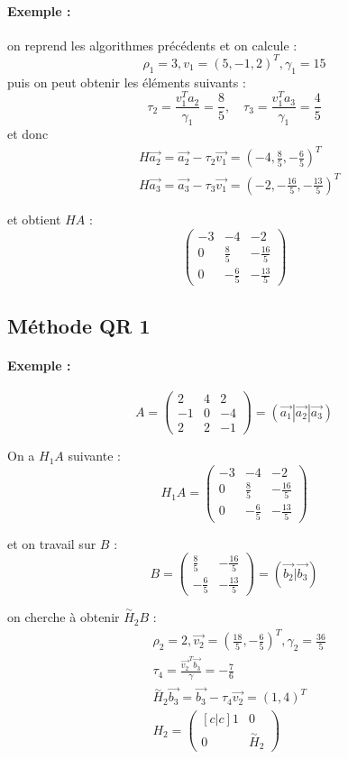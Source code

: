 \documentclass[a4paper,9pt]{extarticle}
\begin{document}
\begin{multicols*}{2}
\paragraph*{Exemple : } on reprend les algorithmes précédents et on calcule :
$$
\rho_1 = 3, v_1 = (5,-1,2)^T, \gamma_1 = 15
$$
puis on peut obtenir les éléments suivants :
$$
\tau_2 = \frac{v^T_1 a_2}{\gamma_1} = \frac{8}{5}, \quad 
\tau_3 = \frac{v^T_1 a_3}{\gamma_1} = \frac{4}{5}
$$
et donc
\begin{align*}
& H\vec{a_2} = \vec{a_2} - \tau_2\vec{v_1} = (-4,\frac{8}{5},-\frac{6}{5})^T \\
& H\vec{a_3} = \vec{a_3} - \tau_3\vec{v_1} = (-2,-\frac{16}{5},-\frac{13}{5})^T
\end{align*}

et obtient $HA$ :
$$
\begin{pmatrix}
-3 & -4 & -2 \\
0 & \frac{8}{5} & -\frac{16}{5} \\
0 & -\frac{6}{5} & -\frac{13}{5}
\end{pmatrix}
$$

\subsection{Méthode QR 1}
\paragraph*{Exemple : }
$$
A = \begin{pmatrix}
2 & 4 & 2 \\
-1 & 0 & -4 \\
2 & 2 & -1
\end{pmatrix} = (\vec{a_1}|\vec{a_2}|\vec{a_3})
$$

On a $H_1A$ suivante :
$$
H_1A = \begin{pmatrix}
-3 & -4 & -2 \\
0 & \frac{8}{5} & -\frac{16}{5} \\
0 & -\frac{6}{5} & -\frac{13}{5}
\end{pmatrix}
$$

et on travail sur $B$ :
$$
B = \begin{pmatrix}
\frac{8}{5} & -\frac{16}{5} \\
-\frac{6}{5} & -\frac{13}{5}
\end{pmatrix} = (\vec{b_2}|\vec{b_3})
$$

on cherche à obtenir $\overset{\sim}{H}_2B$ :
\begin{align*}
& \rho_2 = 2, \vec{v_2} = (\frac{18}{5},-\frac{6}{5})^T, \gamma_2=\frac{36}{5} \\
& \tau_4 = \frac{\vec{v_2}^T\vec{b_3}}{\gamma} = -\frac{7}{6}\\
& \overset{\sim}{H}_2\vec{b_3} = \vec{b_3} - \tau_4\vec{v_2} = (1,4)^T \\
& H_2 = 
\begin{pmatrix}[c|c]
1 & 0 \\ \hline
0 & \overset{\sim}{H}_2
\end{pmatrix}
\end{align*}


\end{multicols*}
\end{document}
